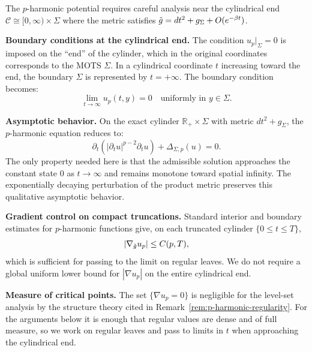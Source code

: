 \begin{remark}\label{rem:cylindrical-regularity}
The $p$-harmonic potential requires careful analysis near the cylindrical end $\mathcal{C} \cong [0, \infty) \times \Sigma$ where the metric satisfies $\tilde{g} = dt^2 + g_\Sigma + O(e^{-\beta t})$.

\textbf{Boundary conditions at the cylindrical end.} The condition $u_p|_\Sigma = 0$ is imposed on the ``end'' of the cylinder, which in the original coordinates corresponds to the MOTS $\Sigma$. In a cylindrical coordinate $t$ increasing toward the end, the boundary $\Sigma$ is represented by $t = +\infty$. The boundary condition becomes:
\[
\lim_{t \to \infty} u_p(t, y) = 0 \quad \text{uniformly in } y \in \Sigma.
\]

\textbf{Asymptotic behavior.} On the exact cylinder $\mathbb{R}_+ \times \Sigma$ with metric $dt^2 + g_\Sigma$, the $p$-harmonic equation reduces to:
\[
\partial_t(|\partial_t u|^{p-2} \partial_t u) + \Delta_{\Sigma, p}(u) = 0.
\]
The only property needed here is that the admissible solution approaches the constant state $0$ as $t \to \infty$ and remains monotone toward spatial infinity. The exponentially decaying perturbation of the product metric preserves this qualitative asymptotic behavior.

\textbf{Gradient control on compact truncations.} Standard interior and boundary estimates for $p$-harmonic functions \cite{tolksdorf1984} give, on each truncated cylinder $\{0 \leq t \leq T\}$,
\[
|\nabla_{\tilde{g}} u_p| \leq C(p,T),
\]
which is sufficient for passing to the limit on regular leaves. We do not require a global uniform lower bound for $|\nabla u_p|$ on the entire cylindrical end.

\textbf{Measure of critical points.} The set $\{\nabla u_p = 0\}$ is negligible for the level-set analysis by the structure theory cited in Remark~\ref{rem:p-harmonic-regularity}. For the arguments below it is enough that regular values are dense and of full measure, so we work on regular leaves and pass to limits in $t$ when approaching the cylindrical end.
\end{remark}

